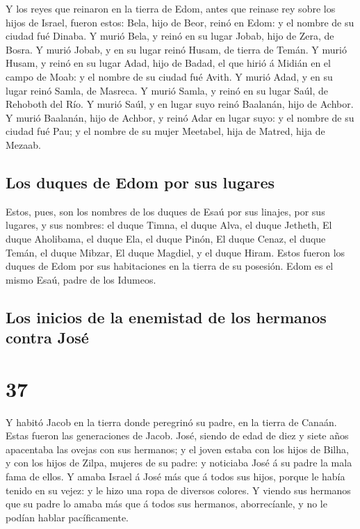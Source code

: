  Y los reyes que reinaron en la tierra de Edom, antes que
reinase rey sobre los hijos de Israel, fueron estos: 
Bela, hijo de Beor, reinó en Edom: y el nombre de su ciudad fué Dinaba.
 Y murió Bela, y reinó en su lugar Jobab, hijo de Zera,
de Bosra.  Y murió Jobab, y en su lugar reinó Husam, de
tierra de Temán.  Y murió Husam, y reinó en su lugar
Adad, hijo de Badad, el que hirió á Midián en el campo de Moab: y el
nombre de su ciudad fué Avith.  Y murió Adad, y en su
lugar reinó Samla, de Masreca.  Y murió Samla, y reinó en
su lugar Saúl, de Rehoboth del Río.  Y murió Saúl, y en
lugar suyo reinó Baalanán, hijo de Achbor.  Y murió
Baalanán, hijo de Achbor, y reinó Adar en lugar suyo: y el nombre de su
ciudad fué Pau; y el nombre de su mujer Meetabel, hija de Matred, hija
de Mezaab.

\hypertarget{los-duques-de-edom-por-sus-lugares}{%
\subsection{Los duques de Edom por sus
lugares}\label{los-duques-de-edom-por-sus-lugares}}

 Estos, pues, son los nombres de los duques de Esaú por
sus linajes, por sus lugares, y sus nombres: el duque Timna, el duque
Alva, el duque Jetheth,  El duque Aholibama, el duque
Ela, el duque Pinón,  El duque Cenaz, el duque Temán, el
duque Mibzar,  El duque Magdiel, y el duque Hiram. Estos
fueron los duques de Edom por sus habitaciones en la tierra de su
posesión. Edom es el mismo Esaú, padre de los Idumeos.

\hypertarget{los-inicios-de-la-enemistad-de-los-hermanos-contra-josuxe9}{%
\subsection{Los inicios de la enemistad de los hermanos contra
José}\label{los-inicios-de-la-enemistad-de-los-hermanos-contra-josuxe9}}

\hypertarget{section-36}{%
\section{37}\label{section-36}}

 Y habitó Jacob en la tierra donde peregrinó su padre, en
la tierra de Canaán.  Estas fueron las generaciones de
Jacob. José, siendo de edad de diez y siete años apacentaba las ovejas
con sus hermanos; y el joven estaba con los hijos de Bilha, y con los
hijos de Zilpa, mujeres de su padre: y noticiaba José á su padre la mala
fama de ellos.  Y amaba Israel á José más que á todos sus
hijos, porque le había tenido en su vejez: y le hizo una ropa de
diversos colores.  Y viendo sus hermanos que su padre lo
amaba más que á todos sus hermanos, aborrecíanle, y no le podían hablar
pacíficamente.

